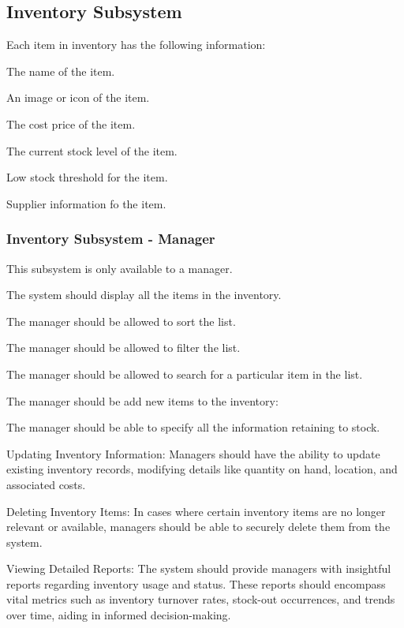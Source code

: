 \documentclass{article}
\begin{document}
	\subsection*{Inventory Subsystem}
	\begin{list}{R.}{}
		\item Each item in inventory has the following information:
		\begin{list}{R.}{}
			\item The name of the item. 
			\item An image or icon of the item.
			\item The cost price of the item.
			\item The current stock level of the item.
			\item Low stock threshold for the item.
			\item Supplier information fo the item.
		\end{list}
	\end{list}
	\subsubsection*{Inventory Subsystem - Manager}	
	\begin{list}{R.}{}
		\item This subsystem is only available to a manager. 
		\item The system should display all the items in the inventory.
		\item The manager should be allowed to sort the list.
		\item The manager should be allowed to filter the list.
		\item The manager should be allowed to search for a particular item in the list.
		\item The manager should be add new items to the inventory:
		\begin{list}{R.}{}
			\item The manager should be able to specify all the information retaining to stock.
		\end{list}
	    \item Updating Inventory Information: Managers should have the ability to update existing inventory records, modifying details like quantity on hand, location, and associated costs.
	    \item Deleting Inventory Items: In cases where certain inventory items are no longer relevant or available, managers should be able to securely delete them from the system.
	    \item Viewing Detailed Reports: The system should provide managers with insightful reports regarding inventory usage and status. These reports should encompass vital metrics such as inventory turnover rates, stock-out occurrences, and trends over time, aiding in informed decision-making.
	\end{list}
\end{document}
